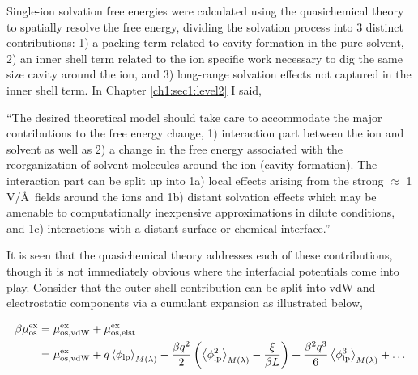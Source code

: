 \begin{tatb}
   Single-ion solvation free energies were calculated using the quasichemical theory to spatially resolve the free energy, dividing the solvation process into 3 
   distinct contributions: 1) a packing term related to cavity formation in the pure solvent, 2) an inner shell term related to the ion specific work necessary to 
   dig the same size cavity around the ion, and 3) long-range solvation effects not captured in the inner shell term. In Chapter \ref{ch1:sec1:level2} I said,
   
   \vspace{12pt}
   
   ``The desired theoretical model should take care to accommodate the major contributions to the free energy change, 1) interaction part between the ion and solvent as
     well as 2) a change in the free energy associated with the reorganization of solvent molecules around the ion (cavity formation). The interaction part can be split 
     up into 1a) local effects arising from the strong $\approx$ 1 V/\AA~fields around the ions\cite{sellner2013ionfield} and 1b) distant solvation effects which may be 
     amenable to computationally inexpensive approximations in dilute conditions, and 1c) interactions with a distant surface or chemical interface.''
     
   \vspace{12pt}
   
   \noindent It is seen that the quasichemical theory addresses each of these contributions, though it is not immediately obvious where the interfacial potentials
   come into play. Consider that the outer shell contribution can be split into vdW and electrostatic components via a cumulant expansion as illustrated below,

   \begin{equation}
    \begin{aligned}
     \beta\mu^{\mathrm{ex}}_{\mathrm{os}} &= \mu^{\mathrm{ex}}_{\mathrm{os, vdW}} + \mu^{\mathrm{ex}}_{\mathrm{os, elst}} \\
                              &= \mu^{\mathrm{ex}}_{\mathrm{os, vdW}} + q\left<\phi_{\mathrm{lp}}\right>_{M(\lambda)}
                                 - \frac{\beta q^{\mathrm{2}}}{2}\left(\left<\phi^{\mathrm{2}}_{\mathrm{lp}}\right>_{M(\lambda)}
                                 - \frac{\xi}{\beta L}\right)
                                 + \frac{\beta^{\mathrm{2}}q^{\mathrm{3}}}{6}\left<\phi^{\mathrm{3}}_{\mathrm{lp}}\right>_{M(\lambda)} + \dots
     \label{eqn:os}
    \end{aligned}
   \end{equation}


\end{tatb}
